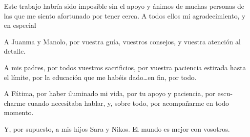 \begin{otherlanguage}{spanish}

Este trabajo habría sido imposible sin el apoyo y ánimos
de muchas personas de las que me siento afortunado por tener cerca. A todos
ellos mi agradecimiento, y en especial

A Juanma y Manolo, por vuestra guía, vuestros consejos, y vuestra atención al detalle.

A mis padres, por todos vuestros sacrificios, por vuestra paciencia estirada hasta el límite,
por la educación que me habéis dado\ldots en fin, por todo.

A Fátima, por haber iluminado mi vida, por tu apoyo y paciencia, por escucharme
cuando necesitaba hablar, y, sobre todo, por acompañarme en todo momento.

Y, por supuesto, a mis hijos Sara y Nikos. El mundo es mejor con  vosotros.


\end{otherlanguage}
